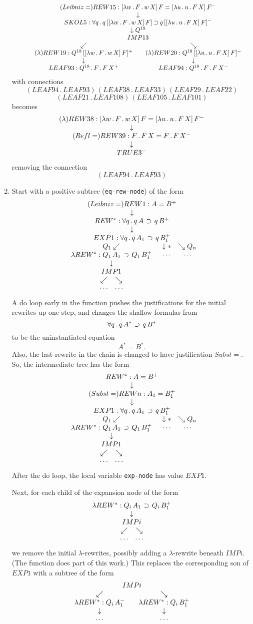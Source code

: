 \begin{enumerate}
$$\erew{15}{Leibniz=}{[\lambda w \, . \, F \, . \, w \, X] \, F = [\lambda u \, . \, u\, . \, F \, X] \, F^-}
{\skol{5}
{\forall q \, . \, q\, [[\lambda w \, . \, F \, . \, w \, X] \, F] \limplies q\,  [[\lambda u \, . \, u\, . \, F \, X] \, F]^-}
{Q^{18}}{\eimp{13}{Q^{18}\, [[\lambda w \, . \, F \, . \, w \, X] \, F] \limplies Q^{18}\,  [[\lambda u \, . \, u\, . \, F \, X] \, F]^-}
{\erew{19}{\lambda}{Q^{18}\, [[\lambda w \, . \, F \, . \, w \, X] \, F]^+}{\eleaf{93}{Q^{18} \, . \, F\, . \, F\, X^+}}}
{\erew{20}{\lambda}{Q^{18}\,  [[\lambda u \, . \, u\, . \, F \, X] \, F]^-}{\eleaf{94}{Q^{18} \, . \, F\, . \, F\, X^-}}}}}$$
with connections
$$(LEAF94\, .\, LEAF93)\, (LEAF38\, .\, LEAF33)\, (LEAF29\, .\, LEAF22)$$
$$(LEAF21\, .\, LEAF108)\, (LEAF105\, .\, LEAF101)$$
becomes
$$\erew{38}{\lambda}{[\lambda w \, . \, F \, . \, w \, X] \, F = [\lambda u \, . \, u\, . \, F \, X] \, F^-}
{\erew{39}{Refl=}{F\, .\, F\, X = F\, . \, F\, X^-}
{\truenode{3^-}}}$$
removing the connection
$$(LEAF94\, .\, LEAF93)$$

\item {\bf{}}
Start with a positive subtree (\verb+eq-rew-node+) of the form
$$\erew{1}{Leibniz=}{A = B^+}{\erewstar{}{\forall q\, . \, q\, A \, \limplies\, q\, B^+}
{\gexpnode{1}{\forall q\, . \, q\, A_1 \, \limplies\, q\, B_1^+}
{Q_1}{\erewstar{\lambda}{Q_1\, A_1 \, \limplies\, Q_1\, B_1^+}
{\eimp{1}{C_1\, \limplies \, D_1^+}{\cdots}{\cdots}}}
{Q_n}{\cdots}}}$$
A do loop early in the function pushes the justifications for the initial
rewrites up one step, and changes the shallow formulas from
$$\forall q \, . \, q \, A^\ast \, \limplies\, q\, B^\ast$$
to be the uninstantiated equation
$$A^\ast = B^\ast.$$
Also, the last rewrite in the chain is changed to have justification $Subst=$.
So, the intermediate tree has the form
$$\erewstar{}{A = B^+}
{\erew{n}{Subst=}{A_1 = B_1^+}
{\gexpnode{1}{\forall q\, . \, q\, A_1 \, \limplies\, q\, B_1^+}
{Q_1}{\erewstar{\lambda}{Q_1\, A_1 \, \limplies\, Q_1\, B_1^+}
{\eimp{1}{C_1\, \limplies \, D_1^+}{\cdots}{\cdots}}}
{Q_n}{\cdots}}}$$
After the do loop, the local variable
\verb+exp-node+ has value $EXP1$.

Next, for each child of the expansion node of the form
$$\erewstar{\lambda}{Q_i\, A_1 \, \limplies\, Q_i\, B_1^+}
{\eimp{i}{C_i\, \limplies \, D_i^+}{\cdots}{\cdots}}$$
we remove the initial $\lambda$-rewrites, possibly
adding a $\lambda$-rewrite beneath $IMPi$.
(The function 
does part of this work.)
This replaces the corresponding son of $EXP1$ with
a subtree of the form
$$\eimp{i}{Q_i\, A_1 \, \limplies\, Q_i\, B_1^+}
{\erewstar{\lambda}{Q_i\, A_1^-}{\cdots}}
{\erewstar{\lambda}{Q_i\, B_1^+}{\cdots}}$$


\end{enumerate}

